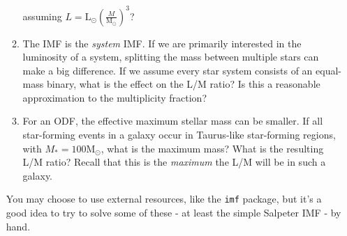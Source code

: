 \documentclass{article}
\newcommand{\msun}{\ensuremath{\mathrm{M}_\odot}\xspace}
\newcommand{\lsun}{\ensuremath{\mathrm{L}_\odot}\xspace}
\begin{document}
\begin{enumerate}
\begin{enumerate}
            assuming $L = \lsun \left(\frac{M}{\msun}\right)^{3}$?
        \item The IMF is the \emph{system} IMF.  If we are primarily interested
            in the luminosity of a system, splitting the mass between multiple
            stars can make a big difference.  If we assume every star system
            consists of an equal-mass binary, what is the effect on the L/M ratio?
            Is this a reasonable approximation to the multiplicity fraction?
        \item For an ODF, the effective maximum stellar mass can be smaller.
            If all star-forming events in a galaxy occur in Taurus-like
            star-forming regions, with $M_*=100\msun$, what is the maximum
            mass?  What is the resulting L/M ratio?  Recall that this is
            the \emph{maximum} the L/M will be in such a galaxy.
    \end{enumerate}

    You may choose to use external resources, like the \texttt{imf} package,
    but it's a good idea to try to solve some of these - at least the simple
    Salpeter IMF - by hand.

\end{enumerate}
\end{document}
